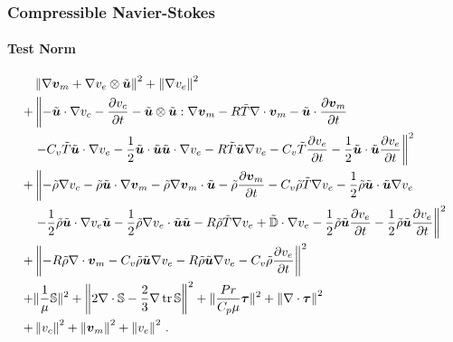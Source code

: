 \documentclass[18pt,xcolor=table]{beamer}
\begin{document}
\begin{frame}[t]
\frametitle{Compressible Navier-Stokes}
\framesubtitle{Test Norm}  %
\vspace{-3ex}
{
\small
\begin{align*}
&\left\| \nabla\boldsymbol v_m+\nabla v_e\otimes\tilde{\boldsymbol u} \right\|^2+\left\| \nabla v_e \right\|^2\\
+&\left\|
-\tilde{\boldsymbol u}\cdot\nabla v_c-\frac{\partial v_c}{\partial t}-\tilde{\boldsymbol u}\otimes\tilde{\boldsymbol u}:\nabla\boldsymbol v_m
-R\tilde T\nabla\cdot\boldsymbol v_m-\tilde{\boldsymbol u}\cdot\frac{\partial\boldsymbol v_m}{\partial t}\right.\\
&\left.-C_v\tilde T\tilde{\boldsymbol u}\cdot\nabla v_e-\frac{1}{2}\tilde{\boldsymbol u}\cdot\tilde{\boldsymbol u}\tilde{\boldsymbol u}\cdot\nabla v_e
-R\tilde T\tilde{\boldsymbol u}\nabla v_e
-C_v\tilde T\frac{\partial v_e}{\partial t}-\frac{1}{2}\tilde{\boldsymbol u}\cdot\tilde{\boldsymbol u}\frac{\partial v_e}{\partial t}
\right\|^2\\
+&\left\|
-\tilde\rho\nabla v_c
-\tilde\rho\tilde{\boldsymbol u}\cdot\nabla\boldsymbol v_m-\tilde\rho\nabla\boldsymbol v_m\cdot\tilde{\boldsymbol u}
-\tilde\rho\frac{\partial\boldsymbol v_m}{\partial t}
-C_v\tilde\rho\tilde T\nabla v_e
-\frac{1}{2}\tilde\rho\tilde{\boldsymbol u}\cdot\tilde{\boldsymbol u}\nabla v_e
\right.\\
&\left.
-\frac{1}{2}\tilde\rho\tilde{\boldsymbol u}\cdot\nabla v_e\tilde{\boldsymbol u}
-\frac{1}{2}\tilde\rho\nabla v_e\cdot\tilde{\boldsymbol u}\tilde{\boldsymbol u}
-R\tilde\rho\tilde T\nabla v_e
+\tilde{\mathbb{D}}\cdot\nabla v_e
-\frac{1}{2}\tilde\rho\tilde{\boldsymbol u}\frac{\partial v_e}{\partial t}
-\frac{1}{2}\tilde\rho\tilde{\boldsymbol u}\frac{\partial v_e}{\partial t}
\right\|^2\\
+&\left\|
-R\tilde\rho\nabla\cdot\boldsymbol v_m
-C_v\tilde\rho\tilde{\boldsymbol u}\nabla v_e
-R\tilde\rho\tilde{\boldsymbol u}\nabla v_e
-C_v\tilde\rho\frac{\partial v_e}{\partial t}
\right\|^2\\
+&\|\frac{1}{\mu}\mathbb{S}\|^2
+\left\| 2\nabla\cdot\mathbb{S}-\frac{2}{3}\nabla\operatorname*{tr}{\mathbb{S}} \right\|^2
+\|\frac{Pr}{C_p\mu}\boldsymbol\tau\|^2
+\left\| \nabla\cdot\boldsymbol\tau \right\|^2\\
+&\left\| v_c \right\|^2+\left\| \boldsymbol v_m \right\|^2+\left\| v_e \right\|^2
\,.
\end{align*}
}
\end{frame}
\end{document}
